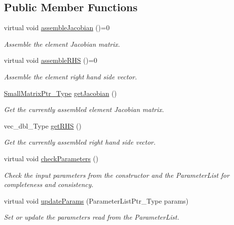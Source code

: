 \subsection*{Public Member Functions}
\begin{DoxyCompactItemize}
\item 
virtual void \hyperlink{classFEDD_1_1AssembleFE_af48b450dfdf6cea7beeb24feef7dc10f}{assemble\+Jacobian} ()=0
\begin{DoxyCompactList}\small\item\em Assemble the element Jacobian matrix. \end{DoxyCompactList}\item 
virtual void \hyperlink{classFEDD_1_1AssembleFE_a43f18446faadb45bb4e2eae4f82ba9ba}{assemble\+R\+HS} ()=0
\begin{DoxyCompactList}\small\item\em Assemble the element right hand side vector. \end{DoxyCompactList}\item 
\hyperlink{classFEDD_1_1AssembleFE_afb5fb5dca3aab59f697a25884e99e894}{Small\+Matrix\+Ptr\+\_\+\+Type} \hyperlink{classFEDD_1_1AssembleFE_af7fb8c5ae1f77eca6e8c7e887ea761ec}{get\+Jacobian} ()
\begin{DoxyCompactList}\small\item\em Get the currently assembled element Jacobian matrix. \end{DoxyCompactList}\item 
vec\+\_\+dbl\+\_\+\+Type \hyperlink{classFEDD_1_1AssembleFE_a15f6f643268ff4571437bbb98b7325c5}{get\+R\+HS} ()
\begin{DoxyCompactList}\small\item\em Get the currently assembled right hand side vector. \end{DoxyCompactList}\item 
virtual void \hyperlink{classFEDD_1_1AssembleFE_a9d471f89532703a619e8a1545cab4602}{check\+Parameters} ()
\begin{DoxyCompactList}\small\item\em Check the input parameters from the constructor and the Parameter\+List for completeness and consistency. \end{DoxyCompactList}\item 
virtual void \hyperlink{classFEDD_1_1AssembleFE_a48ea6d9259f538a88fa5b21667869bce}{update\+Params} (Parameter\+List\+Ptr\+\_\+\+Type params)
\begin{DoxyCompactList}\small\item\em Set or update the parameters read from the Parameter\+List. \end{DoxyCompactList}\item 

\end{DoxyCompactItemize}
